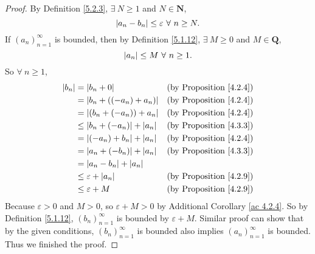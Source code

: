 \begin{proof}
    By Definition \ref{5.2.3}, \(\exists\ N \geq 1\) and \(N \in \mathbf{N}\),
    \[
        \abs*{a_n - b_n} \leq \varepsilon \ \forall\ n \geq N.
    \]
    If \((a_n)_{n = 1}^{\infty}\) is bounded, then by Definition \ref{5.1.12}, \(\exists\ M \geq 0\) and \(M \in \mathbf{Q}\),
    \[
        \abs*{a_n} \leq M \ \forall\ n \geq 1.
    \]
    So \(\forall\ n \geq 1\),
    \begin{align*}
        \abs*{b_n} & = \abs*{b_n + 0}                      & \text{(by Proposition \ref{4.2.4})} \\
                   & = \abs*{b_n + ((-a_n) + a_n)}         & \text{(by Proposition \ref{4.2.4})} \\
                   & = \abs*{(b_n + (-a_n)) + a_n}         & \text{(by Proposition \ref{4.2.4})} \\
                   & \leq \abs*{b_n + (-a_n)} + \abs*{a_n} & \text{(by Proposition \ref{4.3.3})} \\
                   & = \abs*{(-a_n) + b_n} + \abs*{a_n}    & \text{(by Proposition \ref{4.2.4})} \\
                   & = \abs*{a_n + (-b_n)} + \abs*{a_n}    & \text{(by Proposition \ref{4.3.3})} \\
                   & = \abs*{a_n - b_n} + \abs*{a_n}                                             \\
                   & \leq \varepsilon + \abs*{a_n}         & \text{(by Proposition \ref{4.2.9})} \\
                   & \leq \varepsilon + M                  & \text{(by Proposition \ref{4.2.9})} \\
    \end{align*}
    Because \(\varepsilon > 0\) and \(M > 0\), so \(\varepsilon + M > 0\) by Additional Corollary \ref{ac 4.2.4}.
    So by Definition \ref{5.1.12}, \((b_n)_{n = 1}^{\infty}\) is bounded by \(\varepsilon + M\).
    Similar proof can show that by the given conditions, \((b_n)_{n = 1}^{\infty}\) is bounded also implies \((a_n)_{n = 1}^{\infty}\) is bounded.
    Thus we finished the proof.
\end{proof}